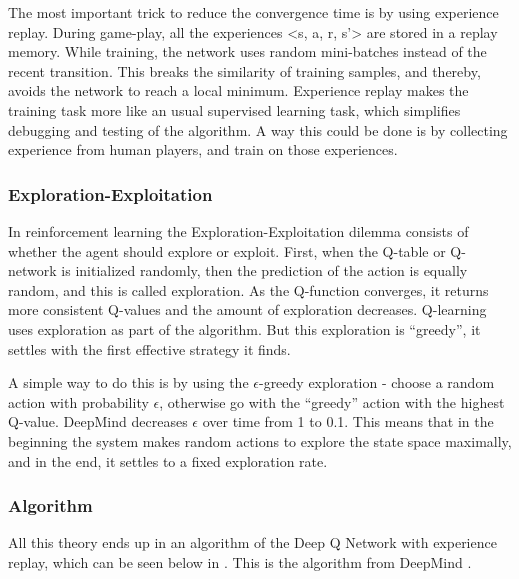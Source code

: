 The most important trick to reduce the convergence time is by using experience replay. During game-play, all the experiences <s, a, r, s’> are stored in a replay memory. While training, the network uses random mini-batches instead of the recent transition. This breaks the similarity of training samples, and thereby, avoids the network to reach a local minimum. Experience replay makes the training task more like an usual supervised learning task, which simplifies debugging and testing of the algorithm. A way this could be done is by collecting experience from human players, and train on those experiences.
  
\subsubsection{Exploration-Exploitation}
In reinforcement learning the Exploration-Exploitation dilemma consists of whether the agent should explore or exploit. First, when the Q-table or Q-network is initialized randomly, then the prediction of the action is equally random, and this is called exploration. As the Q-function converges, it returns more consistent Q-values and the amount of exploration decreases. Q-learning uses exploration as part of the algorithm. But this exploration is “greedy”, it settles with the first effective strategy it finds. 

A simple way to do this is by using the $\epsilon$-greedy exploration - choose a random action with probability $\epsilon$, otherwise go with the “greedy” action with the highest Q-value. DeepMind decreases $\epsilon$ over time from 1 to 0.1. This means that in the beginning the system makes random actions to explore the state space maximally, and in the end, it settles to a fixed exploration rate. 

\subsubsection{Algorithm}
All this theory ends up in an algorithm of the Deep Q Network with experience replay, which can be seen below in . This is the algorithm from DeepMind \cite{DBLP:journals/corr/MnihKSGAWR13}.

